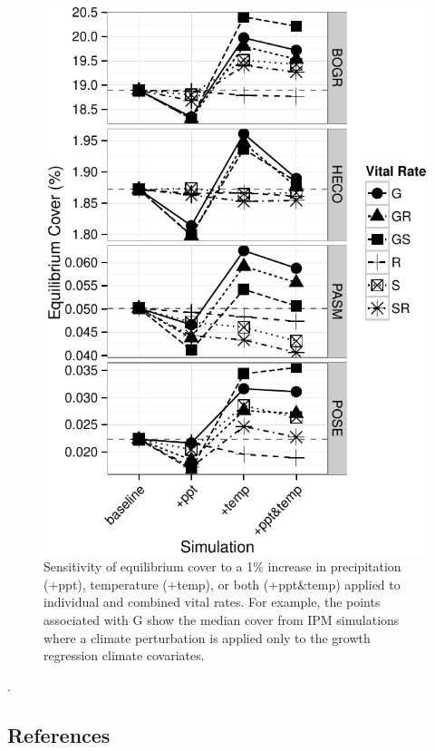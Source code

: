 \documentclass[12pt,]{article}
\begin{document}
\begin{figure}[htbp]
\centering
\includegraphics{components/figure/manuscript-figure_2.pdf}
\caption{Sensitivity of equilibrium cover to a 1\% increase in
precipitation (+ppt), temperature (+temp), or both (+ppt\&temp) applied
to individual and combined vital rates. For example, the points
associated with G show the median cover from IPM simulations where a
climate perturbation is applied only to the growth regression climate
covariates.}
\end{figure}

\pagebreak{}

.

\pagebreak{}

\subsection{References}\label{references}
\end{document}

